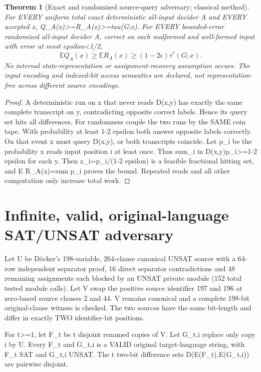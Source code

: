 \documentclass[11pt]{article}
\newtheorem{theorem}{Theorem}
\begin{document}
\begin{theorem}[Exact and randomized source-query adversary; classical method]
For EVERY uniform total exact deterministic all-input decider A and EVERY accepted x, Q_A(x)>=R_A(x)>=tau(G;x). For EVERY bounded-error randomized all-input decider A, correct on each malformed and well-formed input with error at most epsilon<1/2,
\[
\boxed{\mathbb E Q_A(x)\ge\mathbb E R_A(x)\ge(1-2\epsilon)\tau^*(G;x).}
\]
No internal state-representation or assignment-recovery assumption occurs. The input encoding and indexed-bit access semantics are declared, not representation-free across different source encodings.
\end{theorem}
\begin{proof}
A deterministic run on x that never reads D(x,y) has exactly the same complete transcript on y, contradicting opposite correct labels. Hence its query set hits all differences. For randomness couple the two runs by the SAME coin tape. With probability at least 1-2 epsilon both answer opposite labels correctly. On that event x must query D(x,y), or both transcripts coincide. Let p_i be the probability x reads input position i at least once. Thus sum_{i in D(x,y)}p_i>=1-2 epsilon for each y. Then z_i=p_i/(1-2 epsilon) is a feasible fractional hitting set, and E R_A(x)=sum p_i proves the bound. Repeated reads and all other computation only increase total work.
\end{proof}

\section{Infinite, valid, original-language SAT/UNSAT adversary}
Let U be D\"ocker's 198-variable, 264-clause canonical UNSAT source with a 64-row independent separator proof, 16 direct separator contradictions and 48 remaining assignments each blocked by an UNSAT private module (152 total tested module calls). Let V swap the positive source identifier 197 and 196 at zero-based source clauses 2 and 44. V remains canonical and a complete 198-bit original-clause witness is checked. The two sources have the same bit-length and differ in exactly TWO identifier-bit positions.

For t>=1, let F_t be t disjoint renamed copies of V. Let G_{t,i} replace only copy i by U. Every F_t and G_{t,i} is a VALID original target-language string, with F_t SAT and G_{t,i} UNSAT. The t two-bit difference sets D(E(F_t),E(G_{t,i})) are pairwise disjoint.
\end{document}
